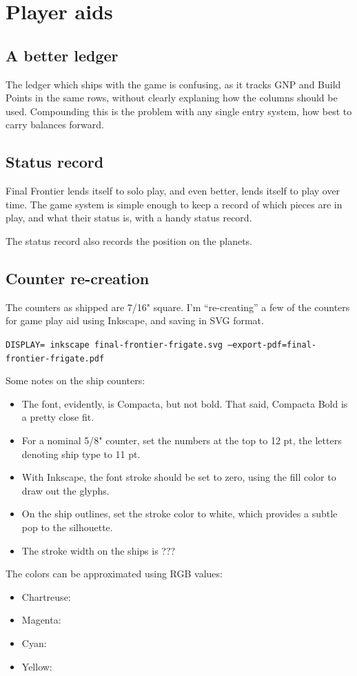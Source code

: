 \documentclass[10pt]{article}
\begin{document}
\appendix

\section{Player aids}

\subsection{A better ledger}

The ledger which ships with the game is confusing, as it tracks GNP and
Build Points in the same rows, without clearly explaning how the columns
should be used. Compounding this is the problem with any single entry system,
how best to carry balances forward.

\subsection{Status record}

Final Frontier lends itself to solo play, and even better, lends itself
to play over time. The game system is simple enough to keep a record of
which pieces are in play, and what their status is, with a handy status
record.

The status record also records the position on the planets.

\subsection{Counter re-creation}

The counters as shipped are 7/16" square. I'm ``re-creating'' a few of the
counters for game play aid using Inkscape, and saving in SVG format.

{\tt DISPLAY= inkscape final-frontier-frigate.svg --export-pdf=final-frontier-frigate.pdf}

Some notes on the ship counters:

\begin{itemize}
  \item The font, evidently, is Compacta, but not bold. That said, Compacta Bold
    is a pretty close fit.
  \item For a nominal 5/8" counter, set the numbers at the top to 12 pt, the letters
    denoting ship type to 11 pt.
  \item With Inkscape, the font stroke should be set to zero, using the fill color to
    draw out the glyphs.
  \item On the ship outlines, set the stroke color to white, which provides a subtle pop
    to the silhouette.
  \item The stroke width on the ships is ???
\end{itemize}

The colors can be approximated using RGB values:

\begin{itemize}
    \item Chartreuse:
    \item Magenta:
    \item Cyan:
    \item Yellow:
\end{itemize}
\end{document}
